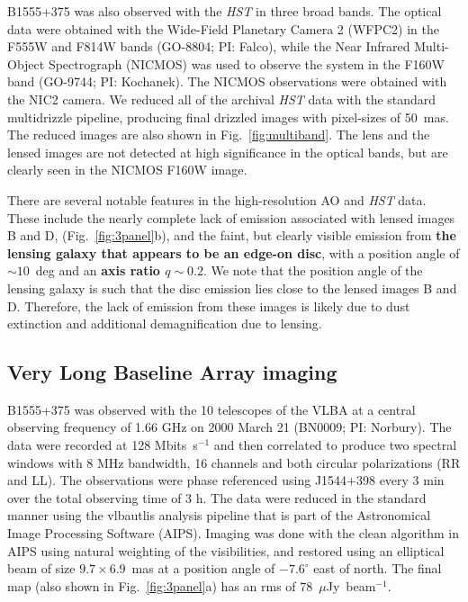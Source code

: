 \documentclass[a4paper,fleqn,usenatbib,useAMS]{mnras}
\begin{document}
B1555+375 was also observed with the {\it HST} in three broad bands.  The optical data were obtained with the Wide-Field Planetary Camera 2 (WFPC2) in the F555W and F814W bands (GO-8804; PI: Falco), while the Near Infrared Multi-Object Spectrograph (NICMOS) was used to observe the system in the F160W band (GO-9744; PI: Kochanek).  The NICMOS observations were obtained with the NIC2 camera.  We reduced all of the archival \textit{HST} data with the standard {\sc multidrizzle} pipeline, producing final drizzled images with pixel-sizes of 50~mas. The reduced images are also shown in Fig.~\ref{fig:multiband}. The lens and the lensed images are not detected at high significance in the optical bands, but are clearly seen in the NICMOS F160W image.

There are several notable features in the high-resolution AO and {\it HST} data. These include the nearly complete lack of emission associated with lensed images B and D, 
(Fig.~\ref{fig:3panel}b), and the faint, but clearly visible emission from {\bf the lensing galaxy that appears to be an edge-on disc}, with a position angle of $\sim 10$~deg and an {\bf axis ratio $q \sim 0.2$}.  We note that the position angle of the lensing galaxy is such that the disc emission lies close to the lensed images B and D. Therefore, the lack of emission from these images is likely due to dust extinction and additional demagnification due to lensing. 

\subsection{Very Long Baseline Array imaging}

B1555+375 was observed with the 10 telescopes of the VLBA at a central observing frequency of 1.66 GHz on 2000 March 21 (BN0009; PI: Norbury). The data were recorded at 128 Mbits~s$^{-1}$ and then correlated to produce two spectral windows with 8 MHz bandwidth, 16 channels and both circular polarizations (RR and LL). The observations were phase referenced using J1544+398 every 3 min over the total observing time of 3 h. The data were reduced in the standard manner using the {\sc vlbautlis} analysis pipeline that is part of the Astronomical Image Processing Software (AIPS). Imaging was done with the {\sc clean} algorithm in AIPS using natural weighting of the visibilities, and restored using an elliptical beam of size $9.7 \times 6.9$~mas at a position angle of $-7.6^\circ$ east of north. The final map (also shown in Fig.~\ref{fig:3panel}a) has an rms of 78~$\mu$Jy~beam$^{-1}$.
\end{document}
